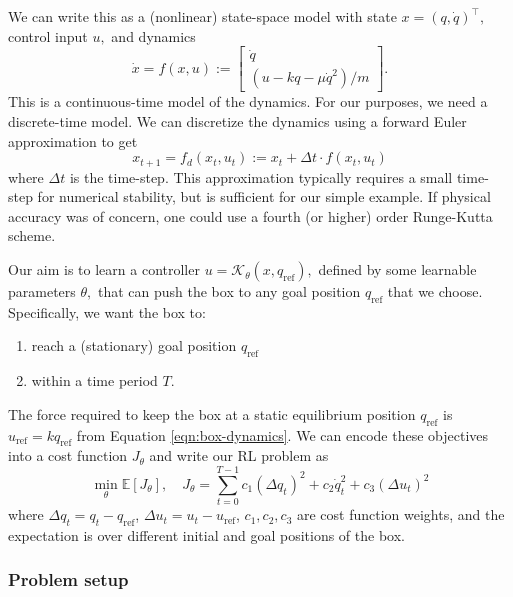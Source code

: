 We can write this as a (nonlinear) state-space model with state $x = (q,\dot{q})^\top,$ control input $u,$ and dynamics
\begin{equation}
\dot{x} = f(x,u) := \begin{bmatrix}
\dot{q} \\ (u - kq - \mu \dot{q}^2)/m
\end{bmatrix}.
\end{equation}
This is a continuous-time model of the dynamics. For our purposes, we need a discrete-time model. We can discretize the dynamics using a forward Euler approximation to get
\begin{equation}
x_{t+1} = f_d(x_t,u_t) := x_t + \Delta t \cdot f(x_t, u_t)
\end{equation}
where $\Delta t$ is the time-step. This approximation typically requires a small time-step for numerical stability, but is sufficient for our simple example. If physical accuracy was of concern, one could use a fourth (or higher) order Runge-Kutta scheme.

Our aim is to learn a controller $u = \mathcal{K}_\theta(x, q_\mathrm{ref}),$ defined by some learnable parameters $\theta,$ that can push the box to any goal position $q_\mathrm{ref}$ that we choose. Specifically, we want the box to:
\begin{enumerate}
    \item reach a (stationary) goal position $q_\mathrm{ref}$
    \item within a time period $T$.
\end{enumerate}
The force required to keep the box at a static equilibrium position $q_\mathrm{ref}$ is $u_\mathrm{ref} = k q_\mathrm{ref}$ from Equation \ref{eqn:box-dynamics}. We can encode these objectives into a cost function $J_\theta$ and write our RL problem as
\begin{equation} \label{eqn:rl-costfunc}
\min_\theta \mathbb{E} \left[ J_\theta \right],
\quad
J_\theta = \sum_{t=0}^{T-1} c_1 (\Delta q_t)^2 + c_2 \dot{q}_t^2 + c_3 (\Delta u_t)^2
\end{equation}
where $\Delta q_t = q_t - q_\mathrm{ref}$, $\Delta u_t = u_t - u_\mathrm{ref}$, $c_1, c_2, c_3$ are cost function weights, and the expectation is over different initial and goal positions of the box.


\subsubsection{Problem setup} \label{sec:rl-setup}


